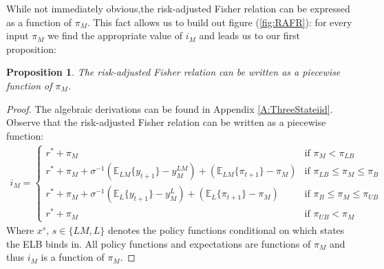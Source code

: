 \documentclass[11pt]{article}
\newtheorem{proposition}{Proposition}
\begin{document}
	While not immediately obvious,the risk-adjusted Fisher relation can be expressed as a function of $\pi_M$. This fact allows us to build out figure (\ref{fig:RAFR}): for every input $\pi_M$ we find the appropriate value of $i_M$ and leads us to our first proposition:
	
	\begin{proposition}
		The risk-adjusted Fisher relation can be written as a piecewise function of $\pi_M$.
	\end{proposition}
	\begin{proof}
		The algebraic derivations can be found in Appendix \ref{A:ThreeStateiid}. Observe that the risk-adjusted Fisher relation can be written as a piecewise function: 
		\begin{align}
		i_M = 
			\begin{cases}
			r^* + \pi_M & \text{if } \pi_M < \pi_{LB}\\
			r^* + \pi_M + \sigma^{-1}\left(\mathbb{E}_{LM}\{y_{t+1}\} - y_M^{LM}\right) + \left(\mathbb{E}_{LM}\{\pi_{t+1}\} - \pi_M\right) & \text{if } \pi_{LB} \le \pi_M \le \pi_{B}\\
			r^* + \pi_M + \sigma^{-1}\left(\mathbb{E}_{L}\{y_{t+1}\} - y_M^{L}\right) + \left(\mathbb{E}_{L}\{\pi_{t+1}\} - \pi_M\right) & \text{if } \pi_{B} \le \pi_M \le \pi_{UB}\\
			 r^* + \pi_M & \text{if } \pi_{UB} < \pi_M			
			\end{cases}
		\end{align}
		Where $x^{s}$, $s\in\{LM, L\}$ denotes the policy functions conditional on which states the ELB binds in. All policy functions and expectations are functions of $\pi_M$ and thus $i_M$ is a function of $\pi_M$. 
	\end{proof}
	
\end{document}
